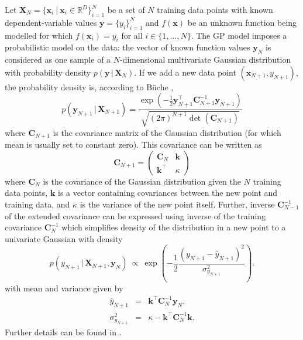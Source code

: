 \documentclass{itatnew}
\newcommand{\xx}{\mathrm{\mathbf{x}}}
\newcommand{\yy}{\mathrm{\mathbf{y}}}
\newcommand{\XX}{\mathrm{\mathbf{X}}}
\newcommand{\CC}{\mathrm{\mathbf{C}}}
\begin{document}
Let $\XX_N = \{\xx_i \ | \ \xx_i \in \mathbb{R}^{D}\}_{i=1}^{N}$ be a set of $N$ training data points with known dependent-variable values $\yy = \{y_i\}_{i=1}^{N}$ and $f(\xx)$ be an unknown function being modelled for which $f(\xx_i) = y_i$ for all $i \in \{1,\ldots,N\}$. The GP model imposes a probabilistic model on the data: the vector of known function values $\yy_N$ is considered as one sample of a $N$-dimensional multivariate Gaussian distribution with probability density $p(\yy \, | \, \XX_N)$. If we add a new data point $(\xx_{N+1}, y_{N+1})$, the probability density is, according to B\"{u}che \cite{buche_accelerating_2005},
\begin{equation}
p(\yy_{N+1} \, | \, \XX_{N+1}) = \frac { \exp(-\frac{1}{2} \yy^\top_{N+1} \CC^{-1}_{N+1} \yy_{N+1}) } { \sqrt{(2\pi)^{N+1} \det(\CC_{N+1})} }
\end{equation}
where $\CC_{N+1}$ is the covariance matrix of the Gaussian distribution (for which mean is usually set to constant zero). This covariance can be written as
\begin{equation}
\CC_{N+1} = \left( \begin{array}{cc} \CC_N & \mathbf{k} \\ \mathbf{k}^\top & \kappa \end{array} \right)
\end{equation}
where $\CC_N$ is the covariance of the Gaussian distribution given the $N$ training data points, $\mathbf{k}$ is a vector containing covariances between the new point and training data, and $\kappa$ is the variance of the new point itself. Further, inverse $\CC^{-1}_{N-1}$ of the extended covariance can be expressed using inverse of the training covariance $\CC^{-1}_N$ which simplifies density of the distribution in a new point to a univariate Gaussian with density
\begin{equation}
p(y_{N+1} \, | \, \XX_{N+1}, \yy_N) \ \varpropto \ \exp \left( -\frac{1}{2} \frac {(y_{N+1} - \hat{y}_{N+1})^2} {\sigma^2_{y_{N+1}}} \right)
\label{univariate-density}.
\end{equation}
with mean and variance given by
\begin{eqnarray}
\hat{y}_{N+1} & = & \mathbf{k}^\top \CC^{-1}_N \yy_N, \\
\sigma^2_{y_{N+1}} & = & \kappa - \mathbf{k}^\top \CC^{-1}_N \mathbf{k}.
\end{eqnarray}
Further details can be found in \cite{buche_accelerating_2005}.
\end{document}
